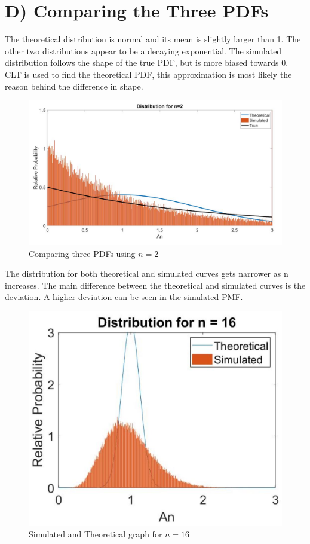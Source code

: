 \documentclass{article}
\begin{document}
\newpage
\vspace*{1cm}
\section*{D) Comparing the Three PDFs}
The theoretical distribution is normal and its mean is slightly larger than 1. The other two distributions appear to be a decaying exponential. The simulated distribution follows the shape of the true PDF, but is more biased towards 0. CLT is used to find the theoretical PDF, this approximation is most likely the reason behind the difference in shape.
\begin{figure}[h!]
\centering
\includegraphics[scale=1.0]{Dpart1.jpg}
\caption{Comparing three PDFs using $n=2$}
\label{graph of $f(A_2)$}
\end{figure}
\newpage
\vspace*{1cm}
The distribution for both theoretical and simulated curves gets narrower as n increases. The main difference between the theoretical and simulated curves is the deviation. A higher deviation can be seen in the simulated PMF.
\begin{figure}[h!]
\centering
\includegraphics[scale=0.8]{Dpart1_2.jpg}
\caption{Simulated and Theoretical graph for $n = 16$}
\label{graph of $f(A_2)$}
\end{figure}
\end{document}
